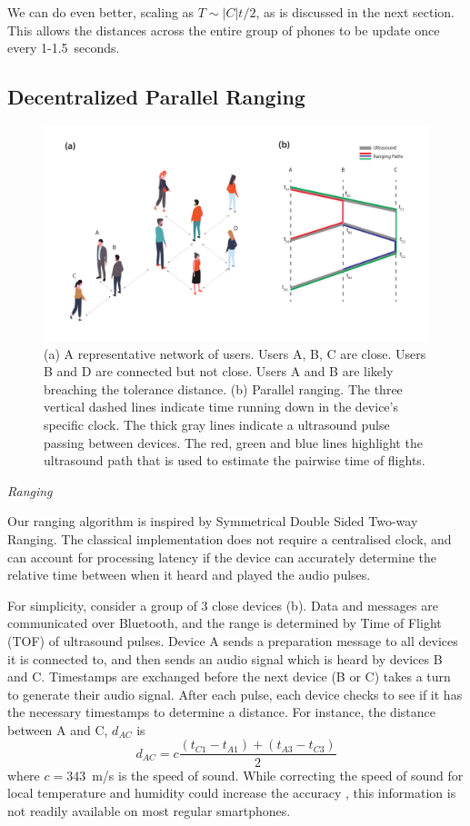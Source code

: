 \documentclass{article}
\begin{document}
We can do even better, scaling as $T\sim|C|t/2$, as is discussed in the next section. This allows the distances across the entire group of phones to be update once every 1-1.5~seconds. 

\subsection{Decentralized Parallel Ranging}

\begin{figure}[tb]
    \centering
    \includegraphics[width=\linewidth]{ranging.pdf}
    \caption{(a) A representative network of users. Users A, B, C are close. Users B and D are connected but not close. Users A and B are likely breaching the tolerance distance. (b) Parallel ranging. The three vertical dashed lines indicate time running down in the device's specific clock. The thick gray lines indicate a ultrasound pulse passing between devices. The red, green and blue lines highlight the ultrasound path that is used to estimate the pairwise time of flights.}
    \label{fig:ranging}
\end{figure}

\emph{Ranging}

Our ranging algorithm is inspired by Symmetrical Double Sided Two-way Ranging. The classical implementation does not require a centralised clock, and can account for processing latency if the device can accurately determine the relative time between when it heard and played the audio pulses.

For simplicity, consider a group of 3 close devices (b). Data and messages are communicated over Bluetooth, and the range is determined by Time of Flight (TOF) of ultrasound pulses. Device A sends a preparation message to all devices it is connected to, and then sends an audio signal which is heard by devices B and C. Timestamps are exchanged before the next device (B or C) takes a turn to generate their audio signal. After each pulse, each device checks to see if it has the necessary timestamps to determine a distance. For instance, the distance between A and C, $d_{AC}$ is
\begin{equation*}
    d_{AC} = c \frac{(t_{C1} - t_{A1}) + (t_{A3}-t_{C3})}{2}
\end{equation*}
where $c=343$~m/s is the speed of sound. While correcting the speed of sound for local temperature and humidity could increase the accuracy \cite{Peng2007}, this information is not readily available on most regular smartphones.
\end{document}
